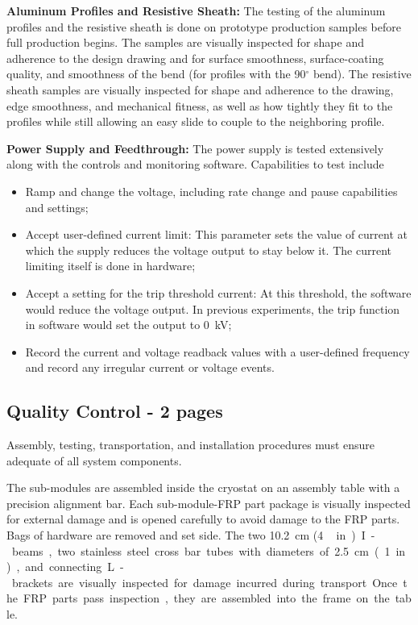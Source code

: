 {\bf Aluminum Profiles and Resistive Sheath:}
The  testing of the aluminum profiles and the resistive sheath is done on prototype production samples before full production begins.   The samples are visually inspected for shape and adherence to the design drawing and for surface smoothness, surface-coating quality, and smoothness of the bend (for profiles with the \num{90}$^{\circ}$ bend).  The resistive sheath samples are visually inspected for shape and adherence to the drawing, edge smoothness, and mechanical fitness, as well as how tightly they fit to the profiles while still allowing an easy slide to couple to the neighboring profile.

{\bf Power Supply and Feedthrough:} The power supply is tested extensively along with the controls and monitoring software.  %
Capabilities to test include
\begin{itemize}
\item Ramp and change the voltage, including rate change and pause capabilities and settings; 
\item Accept user-defined current limit:  This parameter sets the value of current at which the supply reduces the voltage output to stay below it.  The current limiting itself is done in hardware;
\item Accept a setting for the trip threshold current:  At this threshold, the software would reduce the voltage output. 
In previous experiments, the trip function in software would set the output to \SI{0}{kV}; 
\item Record the current and voltage readback values with a user-defined frequency and record any irregular current or voltage events. 
\end{itemize}


\subsection{Quality Control - 2 pages}
\label{sec:fddp-hv-transport-QC}
Assembly, testing, transportation, and installation procedures must ensure adequate  of all  system components.%

The  sub-modules are assembled inside the cryostat on an assembly table with a precision alignment bar.%
Each sub-module-FRP part package is visually inspected for external damage and is opened carefully to avoid damage to the FRP parts.  
Bags of hardware are removed and set side. The two \SI{10.2}{\cm} (\SI{4}\,in) I-beams, two stainless steel cross bar tubes with diameters of \SI{2.5}{cm} (\SI{1}{in}), and connecting L-brackets are visually inspected for  damage incurred during transport.  Once the FRP parts pass inspection, they are assembled into the frame on the table.  

